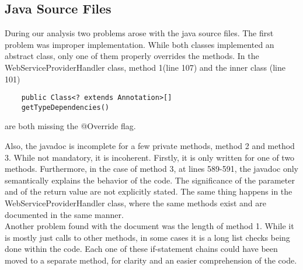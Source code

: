 \subsection{Java Source Files}

During our analysis two problems arose with the java source files. The first problem was improper implementation. While both classes implemented an abstract class, 	only one of them
properly overrides the methods. In the WebServiceProviderHandler class, method 1(line 107) and the inner class (line 101)
\begin{lstlisting}
	public Class<? extends Annotation>[] 
	getTypeDependencies()
\end{lstlisting}

are both missing the @Override flag.

Also, the javadoc is incomplete for a few private methods, method 2 and method 3. While not mandatory, it is incoherent. Firstly, it is only written for one of two methods.
Furthermore, in the case of method 3, at lines 589-591, the javadoc only semantically explains the behavior of the code. The significance of the parameter and of the return value are not
explicitly stated. The same thing happens in the WebServiceProviderHandler class, where the same methods exist and are documented in the same manner.
\\
Another problem found with the document was the length of method 1. While it is mostly just calls to other methods, in some cases it is a long list checks being done within the code. Each
one of these if-statement chains could have been moved to a separate method, for clarity and an easier comprehension of the code.